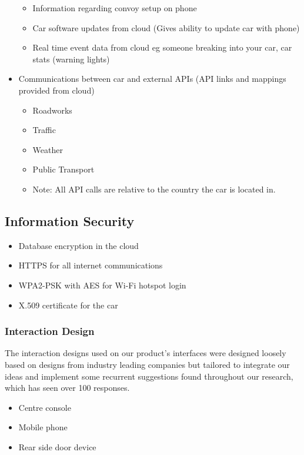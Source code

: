 \documentclass{article}
\begin{document}
\begin{itemize}
\begin{itemize}
            \item Information regarding convoy setup on phone
            \item Car software updates from cloud (Gives ability to update car with phone)
            \item Real time event data from cloud eg someone breaking into your car, car stats (warning lights)
        \end{itemize}
	  \item Communications between car and external APIs (API links and mappings provided from cloud)
        \begin{itemize}
        	\item Roadworks
            \item Traffic
            \item Weather
            \item Public Transport
            \item Note: All API calls are relative to the country the car is located in.
        \end{itemize}
	\end{itemize}

\subsection{Information Security} \label{ssec:information-security}
	\begin{itemize}
		\item Database encryption in the cloud
        \item HTTPS for all internet communications
        \item WPA2-PSK with AES for Wi-Fi hotspot login
        \item X.509 certificate for the car
	\end{itemize}

\subsubsection{Interaction Design} \label{sssec:interaction-design}
The interaction designs used on our product's interfaces were designed loosely based on designs from industry leading companies but tailored to integrate our ideas and implement some recurrent suggestions found throughout our research, which has seen over 100 responses.

    \begin{itemize}
      \item Centre console
      \item Mobile phone
      \item Rear side door device
    \end{itemize}
\end{document}
